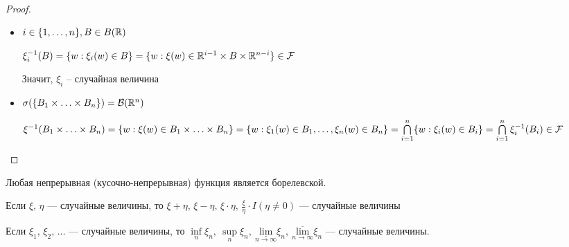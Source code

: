 \begin{proof}
\:\newline
\begin{itemize}
    \item $i \in \{1, \ldots, n\}, B \in B(\mathbb{R})$
    
    $\xi_i^{-1}(B) = \{w : \xi_i(w) \in B\} = \{w : \xi(w) \in \mathbb{R}^{i-1} \times B \times \mathbb{R}^{n-i}\} \in \mathcal{F}$
    
    Значит, $\xi_i$ -- случайная величина
    
    \item $\sigma(\{B_1 \times \ldots \times B_n\})=\mathcal{B}(\mathbb{R}^n)$
    
    $\xi^{-1}(B_1 \times \ldots \times B_n) = \{w : \xi(w) \in B_1 \times \ldots \times B_n\} = \{w : \xi_1(w) \in B_1, \ldots, \xi_n(w) \in B_n\} = \bigcap\limits_{i=1}^n \{w : \xi_i(w) \in B_i\} = \bigcap\limits_{i=1}^n \xi_i^{-1}(B_i) \in \mathcal{F}$
\end{itemize}
\end{proof}

\begin{statement}
Любая непрерывная (кусочно-непрерывная) функция является борелевской.
\end{statement}

\begin{corollary}
Если $\xi,\, \eta$ --- случайные величины, то $\xi + \eta,\, \xi - \eta,\, \xi \cdot \eta,\, \frac{\xi}{\eta} \cdot I(\eta \neq 0)$ --- случайные величины
\end{corollary}

\begin{statement}
Если $\xi_1,\, \xi_2,\, \ldots$ --- случайные величины, то $\inf\limits_{n} \xi_n,\: \sup\limits_{n} \xi_n,\: \underset{n \to \infty}{\underline{\text{lim}}} \xi_n,\: \underset{n \to \infty}{\overline{\text{lim}}} \xi_n$ --- случайные величины.
\end{statement}

